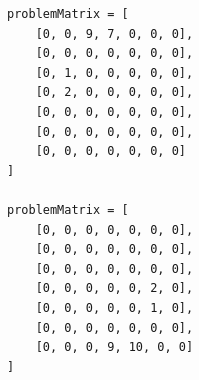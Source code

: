 \documentclass[12pt,twoside]{article}
\begin{document}
\begin{problems}
\ifsolution \solution{}
\begin{verbatim}
problemMatrix = [
    [0, 0, 9, 7, 0, 0, 0],
    [0, 0, 0, 0, 0, 0, 0],
    [0, 1, 0, 0, 0, 0, 0],
    [0, 2, 0, 0, 0, 0, 0],
    [0, 0, 0, 0, 0, 0, 0],
    [0, 0, 0, 0, 0, 0, 0],
    [0, 0, 0, 0, 0, 0, 0]
]

problemMatrix = [
    [0, 0, 0, 0, 0, 0, 0],
    [0, 0, 0, 0, 0, 0, 0],
    [0, 0, 0, 0, 0, 0, 0],
    [0, 0, 0, 0, 0, 2, 0],
    [0, 0, 0, 0, 0, 1, 0],
    [0, 0, 0, 0, 0, 0, 0],
    [0, 0, 0, 9, 10, 0, 0]
]
\end{verbatim}
\fi

\end{problems}
\end{document}
